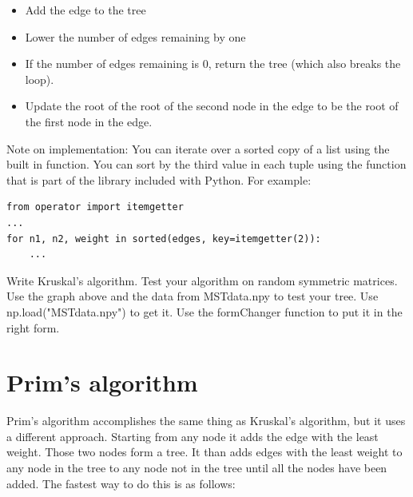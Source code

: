 \begin{itemize}
\begin{itemize}
		\begin{itemize}

		\item Add the edge to the tree

		\item Lower the number of edges remaining by one

		\item If the number of edges remaining is 0, return the tree (which also breaks the loop).

		\item Update the root of the root of the second node in the edge to be the root of the first node in the edge.

		\end{itemize}

	\end{itemize}

\end{itemize}
Note on implementation: You can iterate over a sorted copy of a list using the built in  function.
You can sort by the third value in each tuple using the  function that is part of the  library included with Python.
For example:
\begin{lstlisting}
from operator import itemgetter
...
for n1, n2, weight in sorted(edges, key=itemgetter(2)):
    ...
\end{lstlisting}

\begin{problem}
Write Kruskal's algorithm.
Test your algorithm on random symmetric matrices.
Use the graph above and the data from MSTdata.npy to test your tree.
Use np.load("MSTdata.npy") to get it.
Use the formChanger function to put it in the right form.
\end{problem}

\section*{Prim's algorithm}

Prim's algorithm accomplishes the same thing as Kruskal's algorithm, but it uses a different approach.
Starting from any node it adds the edge with the least weight.
Those two nodes form a tree.
It than adds edges with the least weight to any node in the tree to any node not in the tree until all the nodes have been added.
The fastest way to do this is as follows:

